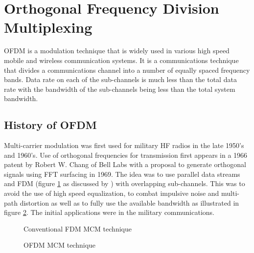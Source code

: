 

\section{Orthogonal Frequency Division Multiplexing}
\gls{OFDM} is a modulation technique that is widely used in various high speed mobile and wireless communication systems. It is a communications technique that divides a communications channel into a number of equally spaced frequency bands. Data rate on each of the sub-channels is much less than the total data rate with the bandwidth of the sub-channels being less than the total system bandwidth. 


\subsection{History of OFDM}
Multi-carrier modulation was first used for military \gls{HF} radios in the late 1950's and 1960's. Use of orthogonal frequencies for transmission first appears in a 1966 patent by Robert W. Chang of Bell Labs\cite{history_ofdm} with a proposal to generate orthogonal signals using \gls{FFT} surfacing in 1969. The idea was to use parallel data streams and \gls{FDM} (figure \ref{Conv_fdm} as discussed by \cite{ofdm_intro}) with overlapping sub-channels. This was to avoid the use of high speed equalization, to combat impulsive noise and multi-path distortion as well as to fully use the available bandwidth as illustrated in figure \ref{Conv_ofdm}\cite{ofdm_intro}. The initial applications were in the military communications.

\begin{figure}[h!]
	\centerline{\resizebox{12cm}{!}{}}
	
	\caption{Conventional \gls{FDM} \gls{MCM} technique}
	\label{Conv_fdm}
\end{figure}

\begin{figure}[h!]
	\centerline{\resizebox{12cm}{!}{}}
	
	\caption{\gls{OFDM} \gls{MCM} technique}
	\label{Conv_ofdm}
\end{figure}

